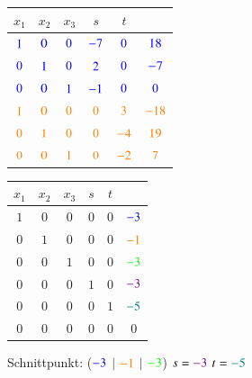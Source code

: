 \begin{minipage}[b]{0.5\columnwidth} 
	\begin{tabular}{| c c c c c | c |}
		\hline
		$x_1$ 		& $x_2$ 	& $x_3$ 	& $s$ 			& $t$ 			& 				\\
		\hline	
		${\color{blue}1}$ 	& ${\color{blue}0}$ & ${\color{blue}0}$	& ${\color{blue}-7}$ 	& ${\color{blue}0}$		& ${\color{blue}18}$	\\
		${\color{blue}0}$ 	& ${\color{blue}1}$ & ${\color{blue}0}$	& ${\color{blue}2}$		& ${\color{blue}0}$		& ${\color{blue}-7}$ 	\\
		${\color{blue}0}$ 	& ${\color{blue}0}$ & ${\color{blue}1}$	& ${\color{blue}-1}$ 	& ${\color{blue}0}$		& ${\color{blue}0}$ 	\\
		${\color{orange}1}$ 	& ${\color{orange}0}$ & ${\color{orange}0}$	& ${\color{orange}0}$		& ${\color{orange}3}$		& ${\color{orange}-18}$ 	\\
		${\color{orange}0}$ 	& ${\color{orange}1}$ & ${\color{orange}0}$	& ${\color{orange}0}$		& ${\color{orange}-4}$ 	& ${\color{orange}19}$ 	\\
		${\color{orange}0}$ 	& ${\color{orange}0}$ & ${\color{orange}1}$	& ${\color{orange}0}$		& ${\color{orange}-2}$ 	& ${\color{orange}7}$ 	\\
		\hline
	\end{tabular}		
\end{minipage}
\hfill
\begin{minipage}[b]{.45\columnwidth} 
	\begin{tabular}{| c c c c c | c |}
		\hline
		$x_1$ 	& $x_2$ & $x_3$ & $s$ & $t$ & 							\\
		\hline
		$1$ 	& $0$ 	& $0$	& $0$ & $0$ & ${\color{blue}-3}$ 				\\
		$0$ 	& $1$ 	& $0$	& $0$ & $0$ & ${\color{orange}-1}$ 				\\
		$0$ 	& $0$ 	& $1$	& $0$ & $0$ & ${\color{green}-3}$ 				\\
		$0$ 	& $0$ 	& $0$	& $1$ & $0$ & ${\color{violet}-3}$ 	\\
		$0$ 	& $0$ 	& $0$	& $0$ & $1$ & $\textcolor{teal}{-5}$ 	\\
		$0$ 	& $0$ 	& $0$	& $0$ & $0$ & $0$ 						\\
		\hline
	\end{tabular}		
\end{minipage}		
	
\vspace{0.2cm}

Schnittpunkt: (${\color{blue}-3}$ $\vert$ ${\color{orange}-1}$ $\vert$ ${\color{green}-3}$) \quad
$s = {\color{violet}-3}$ \quad $t = \textcolor{teal}{-5}$	
	
\vspace{0.4cm}


